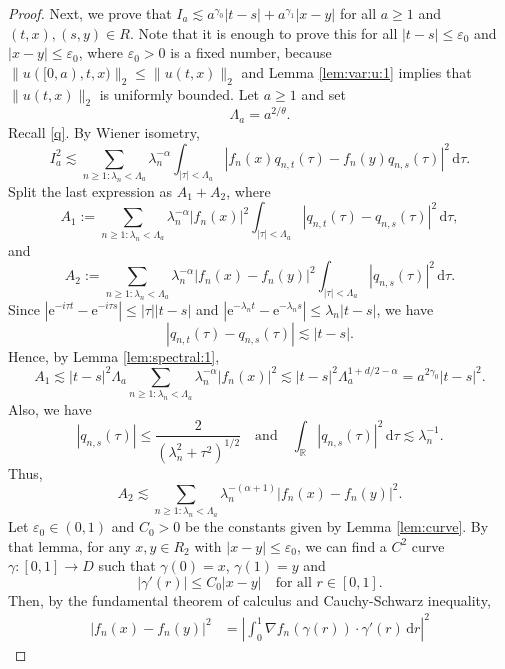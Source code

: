 \documentclass[reqno]{amsart}
\newcommand{\R}{\mathbb R}
\renewcommand{\d}{\mathrm d}
\newcommand{\e}{\mathrm e}
\newcommand{\1}{\mathbf 1}
\numberwithin{equation}{section}
\theoremstyle{definition}
\begin{document}
\begin{proof}
Next, we prove that $I_a \lesssim a^{\gamma_0}|t-s| + a^{\gamma_1} |x-y|$ for all $a \ge 1$ and $(t,x),(s,y) \in R$.
Note that it is enough to prove this for all $|t-s| \le \varepsilon_0$ and $|x-y| \le \varepsilon_0$, where $\varepsilon_0>0$ is a fixed number, because $\|u([0,a),t,x)\|_2 \le \|u(t,x)\|_2$ and Lemma  \ref{lem:var:u:1} implies that $\|u(t,x)\|_2$ is uniformly bounded.
Let $a \ge 1$ and set 
\[
	\Lambda_a=a^{2/\theta}.
\]
Recall \eqref{q}. 
By Wiener isometry,
\[
    I_a^2
    \lesssim
    \sum_{n \ge 1: \lambda_n<\Lambda_a}
    \lambda_n^{-\alpha}
    \int_{|\tau|<\Lambda_a}
    |f_n(x)q_{n,t}(\tau)-f_n(y)q_{n,s}(\tau)|^2\,\d\tau .
\]
Split the last expression as \(A_1+A_2\), where
\[
    A_1:=
    \sum_{n \ge 1: \lambda_n<\Lambda_a}
    \lambda_n^{-\alpha}|f_n(x)|^2
    \int_{|\tau|<\Lambda_a}|q_{n,t}(\tau)-q_{n,s}(\tau)|^2\,\d\tau,
\]
and
\[
    A_2:=
    \sum_{n \ge 1: \lambda_n<\Lambda_a}
    \lambda_n^{-\alpha}|f_n(x)-f_n(y)|^2
    \int_{|\tau|<\Lambda_a}|q_{n,s}(\tau)|^2\,\d\tau .
\]
Since $|\e^{-i\tau t}-\e^{-i\tau s}|\le|\tau||t-s|$ and $|\e^{-\lambda_n t}-\e^{-\lambda_n s}|\le\lambda_n|t-s|$,
we have 
\[
	|q_{n,t}(\tau)-q_{n,s}(\tau)|\lesssim |t-s|.
\]
Hence, by Lemma \ref{lem:spectral:1},
\[
    A_1
    \lesssim
    |t-s|^2\Lambda_a
    \sum_{n \ge 1: \lambda_n<\Lambda_a}\lambda_n^{-\alpha}|f_n(x)|^2
    \lesssim
    |t-s|^2\Lambda_a^{1+d/2-\alpha}
    =
    a^{2\gamma_0}|t-s|^2 .
\]
Also, we have
\[
	|q_{n,s}(\tau)|\le \frac2{(\lambda_n^2+\tau^2)^{1/2}}
	\quad \text{and}\quad 
	\int_\R |q_{n,s}(\tau)|^2\,\d\tau\lesssim\lambda_n^{-1}.
\]
Thus,
\[
    A_2
    \lesssim
    \sum_{n \ge 1: \lambda_n<\Lambda_a}
    \lambda_n^{-(\alpha+1)}|f_n(x)-f_n(y)|^2 .
\]
Let $\varepsilon_0 \in (0,1)$ and $C_0>0$ be the constants given by Lemma \ref{lem:curve}.
By that lemma, for any $x,y \in R_2$ with $|x-y|\le\varepsilon_0$, we can find a $C^2$ curve $\gamma:[0,1] \to D$ such that $\gamma(0)=x$, $\gamma(1) = y$ and 
\[
	|\gamma'(r)| \le C_0|x-y| \quad \text{for all $r \in [0,1]$.}
\]
Then, by the fundamental theorem of calculus and Cauchy-Schwarz inequality,
\begin{align*}
    |f_n(x)-f_n(y)|^2 
    &=
    \left|\int_0^1 \nabla f_n(\gamma(r))\cdot\gamma'(r)\,\d r\right|^2

\end{align*}
\end{proof}
\end{document}
